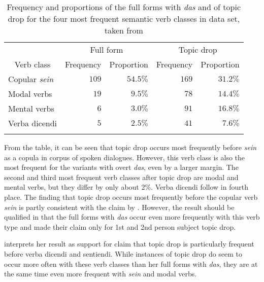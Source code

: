\begin{table}
\caption[Verb classes in \citet{helmer2016}]{Frequency and proportions of the full forms with \textit{das} and of topic drop for the four most frequent semantic verb classes in  data set, taken from \citet[212]{helmer2016}}
\centering
\begin{tabular}{lrrrr}
\lsptoprule
& \multicolumn{2}{c}{Full form} & \multicolumn{2}{c}{Topic drop}  \\
\multicolumn{1}{c}{Verb class} & Frequency & Proportion & Frequency & Proportion\\
\midrule
Copular \textit{sein}  & $109$ & $54.5\%$  & $169$ & $31.2\%$\\
Modal verbs & $19$ & $9.5\%$  & $78$ & $14.4\%$\\
Mental verbs  & $6$ & $3.0\%$ & $91$ & $16.8\%$ \\
Verba dicendi & $5$ & $2.5\%$ & $41$ & $7.6\%$ \\
\lspbottomrule
\end{tabular}
\label{tab:verb.type.helmer}
\end{table}

From the table, it can be seen that topic drop occurs most frequently before \textit{sein} as a copula in  corpus of spoken dialogues.
However, this verb class is also the most frequent for the variants with overt \textit{das}, even by a larger margin.
The second and third most frequent verb classes after topic drop are modal and mental verbs, but they differ by only about 2\%.
Verba dicendi follow in fourth place.
The finding that topic drop occurs most frequently before the copular verb \textit{sein} is partly consistent with the claim by \citet{zifonun.etal1997}.
However, the result should be qualified in that the full forms with \textit{das} occur even more frequently with this verb type and \citet{zifonun.etal1997} made their claim only for 1st and 2nd person subject topic drop.

\citet{helmer2016} interprets her result as support for  claim that topic drop is particularly frequent before verba dicendi and sentiendi.
While  instances of topic drop do seem to occur more often with these verb classes than her  full forms with \textit{das}, they are at the same time even more frequent with \textit{sein} and modal verbs.

